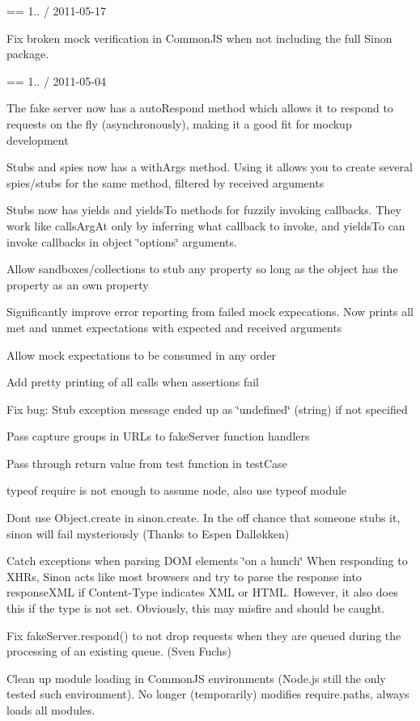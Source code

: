 == 1.. / 2011-\/05-\/17
\begin{DoxyItemize}
\item Fix broken mock verification in Common\+JS when not including the full Sinon package.
\end{DoxyItemize}

== 1.. / 2011-\/05-\/04
\begin{DoxyItemize}
\item The fake server now has a auto\+Respond method which allows it to respond to requests on the fly (asynchronously), making it a good fit for mockup development
\item Stubs and spies now has a with\+Args method. Using it allows you to create several spies/stubs for the same method, filtered by received arguments
\item Stubs now has yields and yields\+To methods for fuzzily invoking callbacks. They work like calls\+Arg\+At only by inferring what callback to invoke, and yields\+To can invoke callbacks in object \char`\"{}options\char`\"{} arguments.
\item Allow sandboxes/collections to stub any property so long as the object has the property as an own property
\item Significantly improve error reporting from failed mock expecations. Now prints all met and unmet expectations with expected and received arguments
\item Allow mock expectations to be consumed in any order
\item Add pretty printing of all calls when assertions fail
\item Fix bug\+: Stub exception message ended up as \char`\"{}undefined\char`\"{} (string) if not specified
\item Pass capture groups in U\+R\+Ls to fake\+Server function handlers
\item Pass through return value from test function in test\+Case
\item typeof require is not enough to assume node, also use typeof module
\item Don\textquotesingle{}t use Object.\+create in sinon.\+create. In the off chance that someone stubs it, sinon will fail mysteriously (Thanks to Espen Dalløkken)
\item Catch exceptions when parsing D\+OM elements \char`\"{}on a hunch\char`\"{} When responding to X\+H\+Rs, Sinon acts like most browsers and try to parse the response into response\+X\+ML if Content-\/\+Type indicates X\+ML or H\+T\+ML. However, it also does this if the type is not set. Obviously, this may misfire and should be caught.
\item Fix fake\+Server.\+respond() to not drop requests when they are queued during the processing of an existing queue. (Sven Fuchs)
\item Clean up module loading in Common\+JS environments (Node.\+js still the only tested such environment). No longer (temporarily) modifies require.\+paths, always loads all modules.
\end{DoxyItemize}

